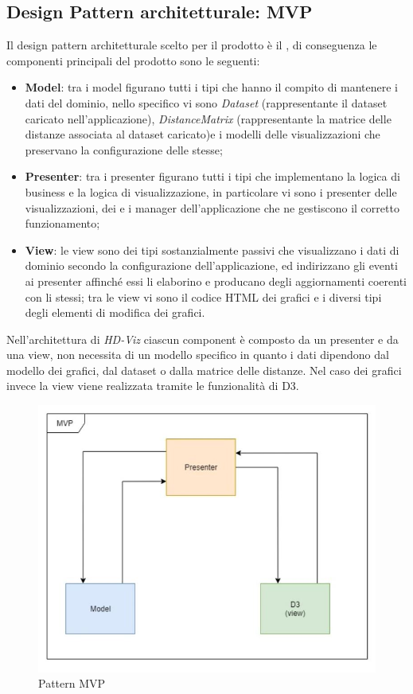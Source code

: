 \documentclass[../manuale_sviluppatore.tex]{subfiles}
\begin{document}
\subsection{Design Pattern architetturale: MVP}
Il design pattern architetturale scelto per il prodotto è il , di 
conseguenza le componenti principali del prodotto sono le seguenti:
\begin{itemize}
	\item \textbf{Model}: tra i model figurano tutti i tipi che hanno il compito di mantenere i dati 
	del dominio, nello specifico vi sono \emph{Dataset} (rappresentante il dataset caricato 
	nell'applicazione), \emph{DistanceMatrix} (rappresentante la matrice delle distanze associata 
	al dataset caricato)e i modelli delle visualizzazioni che preservano la configurazione delle 
	stesse;
	\item \textbf{Presenter}: tra i presenter figurano tutti i tipi che implementano la logica di 
	business e la logica di visualizzazione, in particolare vi sono i presenter delle 
	visualizzazioni, dei  e i manager dell'applicazione che ne gestiscono il 
	corretto funzionamento;
	\item \textbf{View}: le view sono dei tipi sostanzialmente passivi che visualizzano i dati di 
	dominio secondo la configurazione dell'applicazione, ed indirizzano gli eventi ai presenter 
	affinché essi li elaborino e producano degli aggiornamenti coerenti con li stessi; tra le view 
	vi sono il codice HTML dei grafici e i diversi tipi degli elementi di modifica dei grafici.
\end{itemize}

Nell'architettura di \emph{HD-Viz} ciascun component è composto da un presenter e da una view, 
non necessita di un modello specifico in quanto i dati dipendono dal modello dei grafici, dal 
dataset o dalla matrice delle distanze. Nel caso dei grafici invece la view viene realizzata 
tramite le funzionalità di D3.

\begin{figure}[H]
	\centering
	\includegraphics[width=18cm]{src/img/patternMVP.jpg}
	\caption{Pattern MVP}
\end{figure}
\end{document}
